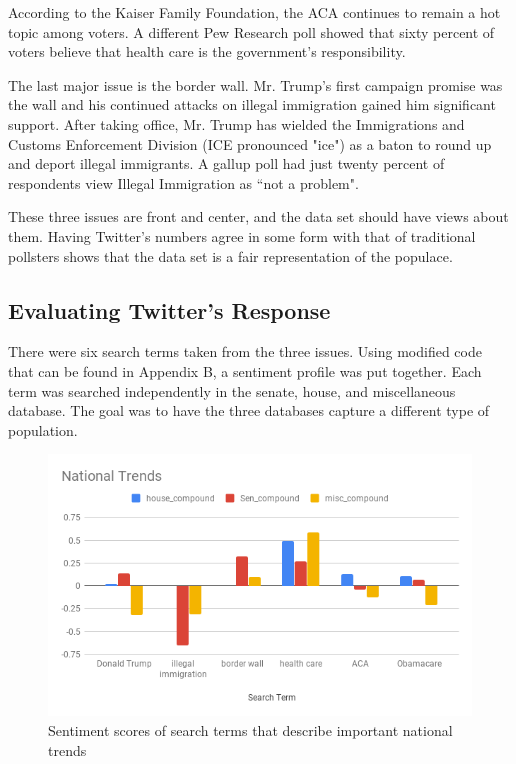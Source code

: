 \documentclass[11pt, twoside, reqno]{book}
\begin{document}
According to the Kaiser Family Foundation, the ACA continues to remain a hot topic among voters. A different Pew Research poll showed that sixty percent of voters believe that health care is the government's responsibility. 

The last major issue is the border wall. Mr. Trump's first campaign promise was the wall and his continued attacks on illegal immigration gained him significant support. After taking office, Mr. Trump has wielded the Immigrations and Customs Enforcement Division (ICE pronounced "ice") as a baton to round up and deport illegal immigrants. A gallup poll had just twenty percent of respondents view Illegal Immigration as ``not a problem". 

These three issues are front and center, and the data set should have views about them. Having Twitter's numbers agree in some form with that of traditional pollsters shows that the data set is a fair representation of the populace. 

\subsection{Evaluating Twitter's Response}
\hspace{0.2in}There were six search terms taken from the three issues. Using modified code that can be found in Appendix B, a sentiment profile was put together. Each term was searched independently in the senate, house, and miscellaneous database. The goal was to have the three databases capture a different type of population. 
\begin{figure}[H]
	\includegraphics[scale=0.65]{natty_trends}	
	\caption{Sentiment scores of search terms that describe important national trends}
	\label{fig:natty_trends}
\end{figure}
\end{document}
